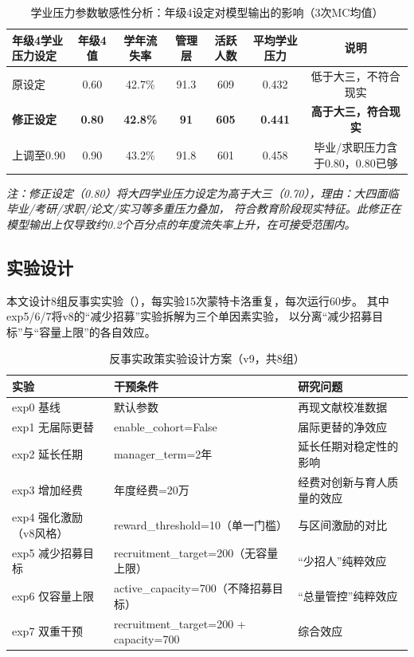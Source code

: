 \documentclass[12pt,a4paper]{article}
\begin{document}
\begin{table}[htbp]
\caption{学业压力参数敏感性分析：年级4设定对模型输出的影响（3次MC均值）}
\centering
\scriptsize
\begin{tabular}{lcccccc}
\toprule
年级4学业压力设定 & 年级4值 & 学年流失率 & 管理层 & 活跃人数 & 平均学业压力 & 说明 \\
\midrule
原设定 & 0.60 & 42.7\% & 91.3 & 609 & 0.432 & 低于大三，不符合现实 \\
\textbf{修正设定} & \textbf{0.80} & \textbf{42.8\%} & \textbf{91} & \textbf{605} & \textbf{0.441} & \textbf{高于大三，符合现实} \\
上调至0.90 & 0.90 & 43.2\% & 91.8 & 601 & 0.458 & 毕业/求职压力含于0.80，0.80已够 \\
\midrule
\end{tabular}
\end{table}
\textit{注：修正设定（0.80）将大四学业压力设定为高于大三（0.70），理由：大四面临毕业/考研/求职/论文/实习等多重压力叠加，
符合教育阶段现实特征。此修正在模型输出上仅导致约0.2个百分点的年度流失率上升，在可接受范围内。}

\subsection{实验设计}

本文设计8组反事实实验（），每实验15次蒙特卡洛重复，每次运行60步。
其中exp5/6/7将v8的“减少招募”实验拆解为三个单因素实验，
以分离“减少招募目标”与“容量上限”的各自效应。

\begin{table}[H]
\caption{反事实政策实验设计方案（v9，共8组）}
\centering
\scriptsize
\begin{tabular}{p{1.5cm}p{4.5cm}p{4.5cm}}
\toprule
\textbf{实验} & \textbf{干预条件} & \textbf{研究问题} \\
\midrule
exp0 基线 & 默认参数 & 再现文献校准数据 \\
exp1 无届际更替 & enable\_cohort=False & 届际更替的净效应 \\
exp2 延长任期 & manager\_term=2年 & 延长任期对稳定性的影响 \\
exp3 增加经费 & 年度经费=20万 & 经费对创新与育人质量的效应 \\
exp4 强化激励（v8风格） & reward\_threshold=10（单一门槛） & 与区间激励的对比 \\
exp5 减少招募目标 & recruitment\_target=200（无容量上限） & “少招人”纯粹效应 \\
exp6 仅容量上限 & active\_capacity=700（不降招募目标） & “总量管控”纯粹效应 \\
exp7 双重干预 & recruitment\_target=200 + capacity=700 & 综合效应 \\
\bottomrule
\end{tabular}
\end{table}
\end{document}
